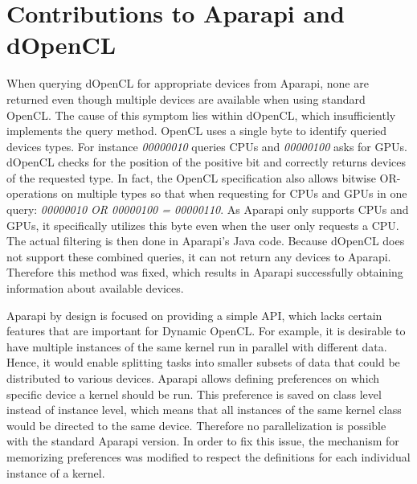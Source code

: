 \section*{Contributions to Aparapi and dOpenCL}
\begin{description}[style=nextline]
	\item [No available devices]
	When querying dOpenCL for appropriate devices from Aparapi, none are returned even though multiple devices are available when using standard OpenCL. The cause of this symptom lies within dOpenCL, which insufficiently implements the query method. OpenCL uses a single byte to identify queried devices types. For instance \textit{00000010} queries CPUs and \textit{00000100} asks for GPUs. dOpenCL checks for the position of the positive bit and correctly returns devices of the requested type. In fact, the OpenCL specification also allows bitwise OR-operations on multiple types so that when requesting for CPUs and GPUs in one query: \textit{00000010 OR 00000100 = 00000110}. As Aparapi only supports CPUs and GPUs, it specifically utilizes this byte even when the user only requests a CPU. The actual filtering is then done in Aparapi's Java code. Because dOpenCL does not support these combined queries, it can not return any devices to Aparapi. Therefore this method was fixed, which results in Aparapi successfully obtaining information about available devices.

	\item [Specific device choice]
	Aparapi by design is focused on providing a simple API, which lacks certain features that are important for Dynamic OpenCL. For example, it is desirable to have multiple instances of the same kernel run in parallel with different data. Hence, it would enable splitting tasks into smaller subsets of data that could be distributed to various devices. Aparapi allows defining preferences on which specific device a kernel should be run. This preference is saved on class level instead of instance level, which means that all instances of the same kernel class would be directed to the same device. Therefore no parallelization is possible with the standard Aparapi version. In order to fix this issue, the mechanism for memorizing preferences was modified to respect the definitions for each individual instance of a kernel.


\end{description}
